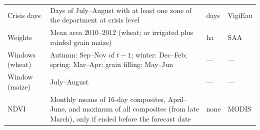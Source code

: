 \begin{table}[H]
\begin{tabular}{>{\raggedright}p{3.2cm}>{\raggedright}p{6.9cm}>{\raggedright}p{1.6cm}>{\raggedright\arraybackslash}p{2.1cm}}
Crisis days & Days of July--August with at least one zone of the department at crisis level & days & VigiEau \\
Weights & Mean area 2010--2012 (wheat; or irrigated plus rainfed grain maize) & ha & SAA \\
Windows (wheat) & Autumn: Sep--Nov of $t-1$; winter: Dec--Feb; spring: Mar--Apr; grain filling: May--Jun & --- & --- \\
Window (maize) & July--August & --- & --- \\
NDVI & Monthly means of 16-day composites, April--June, and maximum of all composites (from late March), only if ended before the forecast date & none & MODIS \\
\bottomrule
\end{tabular}
\end{table}
